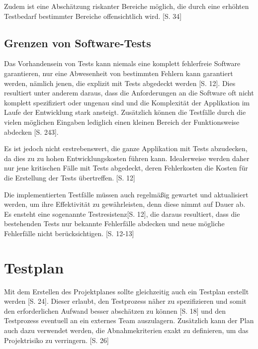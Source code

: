 \documentclass[a4paper,bibtotoc,oneside]{scrbook}
\begin{document}
Zudem ist eine Abschätzung riskanter Bereiche möglich, die durch eine erhöhten Testbedarf bestimmter Bereiche offensichtlich wird. \cite{testing_apps_on_web}[S. 34]


\section{Grenzen von Software-Tests}
Das Vorhandensein von Tests kann niemals eine komplett fehlerfreie Software garantieren, nur eine Abwesenheit von bestimmten Fehlern kann garantiert werden, nämlich jenen, die explizit mit Tests abgedeckt werden \cite{eval_regression}[S. 12]. Dies resultiert unter anderem daraus, dass die Anforderungen an die Software oft nicht komplett spezifiziert oder ungenau sind und die Komplexität der Applikation im Laufe der Entwicklung stark ansteigt. Zusätzlich können die Testfälle durch die vielen möglichen Eingaben lediglich einen kleinen Bereich der Funktionsweise abdecken \cite{software_qual}[S. 243].

Es ist jedoch nicht erstrebenswert, die ganze Applikation mit Tests abzudecken, da dies zu zu hohen Entwicklungskosten führen kann. Idealerweise werden daher nur jene kritischen Fälle mit Tests abgedeckt, deren Fehlerkosten die Kosten für die Erstellung der Tests übertreffen. \cite{eval_regression}[S. 12]

Die implementierten Testfälle müssen auch regelmäßig gewartet und aktualisiert werden, um ihre Effektivität zu gewährleisten, denn diese nimmt auf Dauer ab. Es ensteht eine sogenannte \glqq Testresistenz\grqq\cite{eval_regression}[S. 12], die daraus resultiert, dass die bestehenden Tests nur bekannte Fehlerfälle abdecken und neue mögliche Fehlerfälle nicht berücksichtigen. \cite{eval_regression}[S. 12-13]

\chapter{Testplan}

Mit dem Erstellen des Projektplanes sollte gleichzeitig auch ein Testplan erstellt werden \cite{eval_automat_webapp_test}[S. 24]. Dieser erlaubt, den Testprozess näher zu spezifizieren und somit den erforderlichen Aufwand besser abschätzen zu können \cite{test_large_systems}[S. 18] und den Testprozess eventuell an ein externes Team auszulagern. Zusätzlich kann der Plan auch dazu verwendet werden, die Abnahmekriterien exakt zu definieren, um das Projektrisiko zu verringern. \cite{eval_automat_webapp_test}[S. 26]
\end{document}
